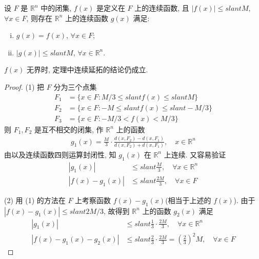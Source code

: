 \documentclass[../../main.tex]{subfiles}
\begin{document}
\begin{theorem}\label{theorem:连续函数延拓定理(Tietze扩张定理)}
设 $F$ 是 $\mathbb{R}^n$ 中的闭集, $f(x)$ 是定义在 $F$ 上的连续函数, 且 $|f(x)| \leqslant slant M$, $\forall x \in F$, 则存在 $\mathbb{R}^n$ 上的连续函数 $g(x)$ 满足:
\begin{enumerate}[(i)]
\item $g(x) = f(x)$, $\forall x \in F$;
\item $|g(x)| \leqslant slant M$, $\forall x \in \mathbb{R}^n$.
\end{enumerate}
\end{theorem}
\begin{remark}
$f(x)$ 无界时, 定理中连续延拓的结论仍成立. 
\end{remark}
\begin{proof}
(1) 把 $F$ 分为三个点集
\begin{align*}
F_1 &= \{x \in F : M/3 \leqslant slant f(x) \leqslant slant M\}\\
F_2 &= \{x \in F : -M \leqslant slant f(x) \leqslant slant -M/3\}\\
F_3 &= \{x \in F : -M/3 < f(x) < M/3\}
\end{align*}
则 $F_1, F_2$ 是互不相交的闭集, 作 $\mathbb{R}^n$ 上的函数
\begin{align*}
g_1(x) = \frac{M}{3} \cdot \frac{d(x, F_2) - d(x, F_1)}{d(x, F_2) + d(x, F_1)}, \quad x \in \mathbb{R}^n
\end{align*}
由以及连续函数四则运算封闭性, 知 $g_1(x)$ 在 $\mathbb{R}^n$ 上连续. 又容易验证
\begin{align*}
|g_1(x)| &\leqslant slant \frac{M}{3}, \quad \forall x \in \mathbb{R}^n\\
|f(x) - g_1(x)| &\leqslant slant \frac{2M}{3}, \quad \forall x \in F
\end{align*}

(2) 用 (1) 的方法在 $F$ 上考察函数 $f(x) - g_1(x)$(相当于上述的 $f(x)$). 由于 $|f(x) - g_1(x)| \leqslant slant 2M/3$, 故得到 $\mathbb{R}^n$ 上的函数 $g_2(x)$ 满足
\begin{align*}
|g_1(x)| &\leqslant slant \frac{1}{3} \cdot \frac{2M}{3}, \quad \forall x \in \mathbb{R}^n\\
|f(x) - g_1(x) - g_2(x)| &\leqslant slant \frac{2}{3} \cdot \frac{2M}{3} = \left(\frac{2}{3}\right)^2 M, \quad \forall x \in F
\end{align*}


\end{proof}
\end{document}
